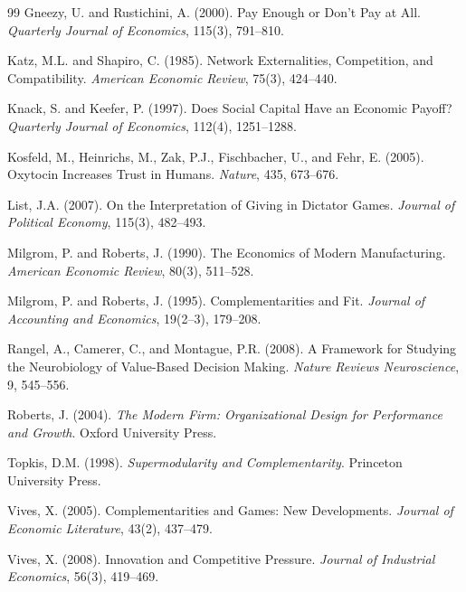 \documentclass[12pt,a4paper]{article}
\begin{document}
\begin{thebibliography}{99}
Gneezy, U. and Rustichini, A. (2000).
Pay Enough or Don't Pay at All.
\emph{Quarterly Journal of Economics}, 115(3), 791–810.

Katz, M.L. and Shapiro, C. (1985).
Network Externalities, Competition, and Compatibility.
\emph{American Economic Review}, 75(3), 424–440.

Knack, S. and Keefer, P. (1997).
Does Social Capital Have an Economic Payoff?
\emph{Quarterly Journal of Economics}, 112(4), 1251–1288.

Kosfeld, M., Heinrichs, M., Zak, P.J., Fischbacher, U., and Fehr, E. (2005).
Oxytocin Increases Trust in Humans.
\emph{Nature}, 435, 673–676.

List, J.A. (2007).
On the Interpretation of Giving in Dictator Games.
\emph{Journal of Political Economy}, 115(3), 482–493.

Milgrom, P. and Roberts, J. (1990).  
The Economics of Modern Manufacturing.  
\emph{American Economic Review}, 80(3), 511–528.

Milgrom, P. and Roberts, J. (1995).  
Complementarities and Fit.  
\emph{Journal of Accounting and Economics}, 19(2–3), 179–208.

Rangel, A., Camerer, C., and Montague, P.R. (2008).
A Framework for Studying the Neurobiology of Value-Based Decision Making.
\emph{Nature Reviews Neuroscience}, 9, 545–556.

Roberts, J. (2004).
\emph{The Modern Firm: Organizational Design for Performance and Growth}.
Oxford University Press.

Topkis, D.M. (1998).  
\emph{Supermodularity and Complementarity}. Princeton University Press.

Vives, X. (2005).
Complementarities and Games: New Developments.
\emph{Journal of Economic Literature}, 43(2), 437–479.

Vives, X. (2008).  
Innovation and Competitive Pressure.  
\emph{Journal of Industrial Economics}, 56(3), 419–469.



\end{thebibliography}
\end{document}
